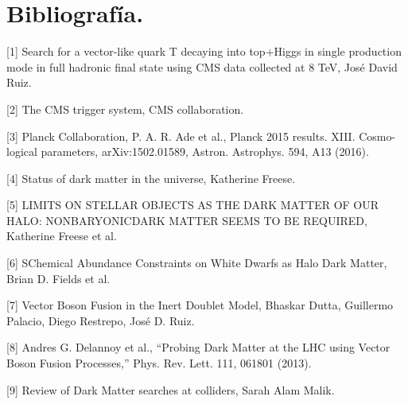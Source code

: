 \newpage

\section{Bibliografía.}

[1] Search for a vector-like quark T decaying into top+Higgs in single production mode in full hadronic final state using CMS data collected at 8 TeV, José David Ruiz.
\vspace{0.5cm}

[2] The CMS trigger system, CMS collaboration.

\vspace{0.5cm}

[3] Planck Collaboration, P. A. R. Ade et al., Planck 2015 results. XIII. Cosmo-
logical parameters, arXiv:1502.01589, Astron. Astrophys. 594, A13 (2016).

\vspace{0.5cm}

[4] Status of dark matter in the universe, Katherine Freese.

\vspace{0.5cm}

[5] LIMITS ON STELLAR OBJECTS AS THE DARK MATTER OF OUR HALO: NONBARYONICDARK MATTER SEEMS TO BE REQUIRED, Katherine Freese et al.

\vspace{0.5cm}

[6] SChemical Abundance Constraints on White Dwarfs as Halo Dark Matter, Brian D. Fields et al.

\vspace{0.5cm}

[7] Vector Boson Fusion in the Inert Doublet Model, Bhaskar Dutta, Guillermo Palacio, Diego Restrepo, José D. Ruiz.

\vspace{0.5cm}

[8] Andres G. Delannoy et al., “Probing Dark Matter at the LHC using Vector Boson Fusion
Processes,” Phys. Rev. Lett. 111, 061801 (2013).

\vspace{0.5cm}

[9] Review of Dark Matter searches at colliders, Sarah Alam Malik.


